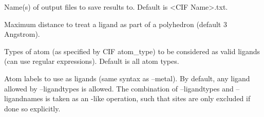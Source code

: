 \documentclass[a4paper,10pt,openany, oneside]{sphinxmanual}
\begin{document}

\begin{fulllineitems}
\label{script_input:cmdoption-CIFellipsoid-o}
Name(s) of output files to save results to. Default is \textless{}CIF Name\textgreater{}.txt.

\end{fulllineitems}


\begin{fulllineitems}
\label{script_input:cmdoption-CIFellipsoid-r}
Maximum distance to treat a ligand as part of a polyhedron (default 3 Angstrom).

\end{fulllineitems}


\begin{fulllineitems}
\label{script_input:cmdoption-CIFellipsoid-l}
Types of atom (as specified by CIF atom\_type) to be considered as valid ligands (can use regular expressions).
Default is all  atom types.

\end{fulllineitems}


\begin{fulllineitems}
\label{script_input:cmdoption-CIFellipsoid-n}
Atom labels to use as ligands (same syntax as --metal). By default, any ligand allowed by --ligandtypes is allowed.
The combination of --ligandtypes and --ligandnames is taken as an -like operation, such that sites are only
excluded if done so explicitly.

\end{fulllineitems}
\end{document}
